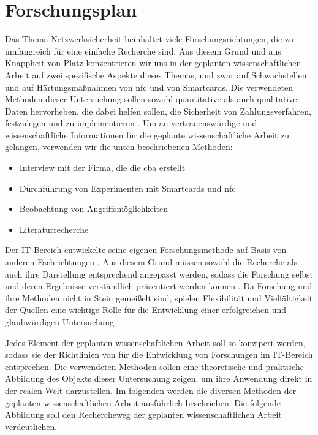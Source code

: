 \section{Forschungsplan}

Das Thema Netzwerksicherheit beinhaltet viele Forschungsrichtungen, die zu umfangreich für eine einfache
Recherche sind. Aus diesem Grund und aus Knappheit von Platz konzentrieren wir uns in der geplanten 
wissenschaftlichen Arbeit auf zwei spezifische Aspekte dieses Themas, und zwar auf Schwachstellen und 
auf Härtungsmaßnahmen von \acrshort{nfc} und von Smartcards. Die verwendeten Methoden dieser Untersuchung 
sollen sowohl quantitative als auch qualitative Daten hervorheben, die dabei helfen sollen, die Sicherheit
von Zahlungsverfahren, festzulegen und zu implementieren \cite{refbook:RMJL}. Um an vertrauenswürdige 
und wissenschaftliche Informationen für die geplante wissenschaftliche Arbeit zu gelangen, verwenden wir die unten
beschriebenen Methoden:

\begin{itemize}
  \item Interview mit der Firma, die die \acrfull{cba} erstellt
  \item Durchführung von Experimenten mit Smartcards und \acrshort{nfc}
  \item Beobachtung von Angriffsmöglichkeiten
  \item Literaturrecherche
\end{itemize}

Der IT-Bereich entwickelte seine eigenen Forschungsmethode auf Basis von anderen Fachrichtungen \cite{inbook:AHDS}.
Aus diesem Grund müssen sowohl die Recherche als auch ihre Darstellung entsprechend angepasst werden, sodass 
die Forschung selbst und deren Ergebnisse verständlich präsentiert werden können \cite{refbook:RMJL}. Da Forschung und 
ihre Methoden nicht in Stein gemeißelt sind, spielen Flexibilität und Vielfältigkeit der Quellen eine wichtige 
Rolle für die Entwicklung einer erfolgreichen und glaubwürdigen Untersuchung.

Jedes Element der geplanten wissenschaftlichen Arbeit soll so konzipert werden, sodass sie der Richtlinien von
\cite{refip:SGRM} für die Entwicklung von Forschungen im IT-Bereich entsprechen. Die verwendeten Methoden 
sollen eine theoretische und praktische Abbildung des Objekts dieser Untersuchung zeigen, um ihre Anwendung 
direkt in der realen Welt darzustellen. Im folgenden werden die diversen Methoden der geplanten wissenschaftlichen 
Arbeit ausführlich beschrieben. Die folgende Abbildung soll den Rechercheweg der geplanten wissenschaftlichen 
Arbeit verdeutlichen.



